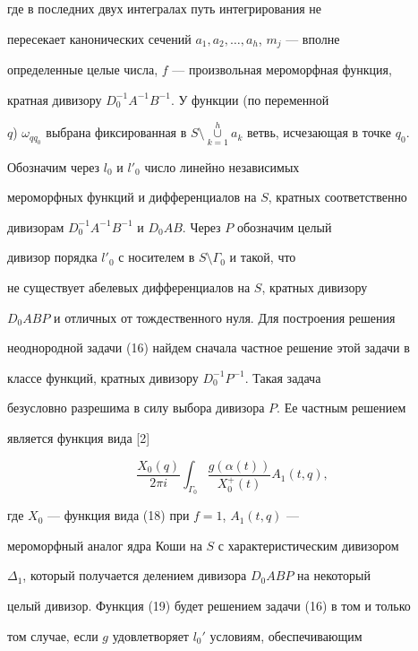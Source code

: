 где в последних двух интегралах путь интегрирования не


пересекает канонических сечений $a_1,a_2,\dotsc,a_h$, $m_j$ --- вполне


определенные целые числа, $f$ --- произвольная мероморфная функция,


кратная дивизору $D_0^{-1}A^{-1}B^{-1}$. У функции (по переменной


$q$) $\omega_{qq_0}$ выбрана фиксированная в $S\setminus


\mathop{\cup}\limits_{k=1}^ha_k$ ветвь, исчезающая в точке $q_0$.





Обозначим через $l_0$ и $l'_0$ число линейно независимых


мероморфных функций и дифференциалов на $S$, кратных соответственно


дивизорам $D_0^{-1}A^{-1}B^{-1}$ и $D_0AB$. Через $P$ обозначим целый


дивизор порядка $l'_0$ с носителем в $S\setminus\Gamma_0$ и такой, что


не существует абелевых дифференциалов на $S$, кратных дивизору


$D_0ABP$ и отличных от тождественного нуля. Для построения решения


неоднородной задачи (16) найдем сначала частное решение этой задачи в


классе функций, кратных дивизору $D_0^{-1}P^{-1}$. Такая задача


безусловно разрешима в силу выбора дивизора $P$. Ее частным решением


является функция вида [2]


\begin{equation}


\frac{X_0(q)}{2\pi i}


\int_{\Gamma_0}\frac{g(\alpha(t))}{X_0^+(t)}A_1(t, q),


\end{equation}


где $X_0$ --- функция вида (18) при $f=1$, $A_1(t, q)$ ---


мероморфный аналог ядра Коши на $S$ с характеристическим дивизором


$\Delta_1$, который получается делением дивизора $D_0ABP$ на некоторый


целый дивизор. Функция (19) будет решением задачи (16) в том и только


том случае, если $g$ удовлетворяет $l_0'$ условиям, обеспечивающим


